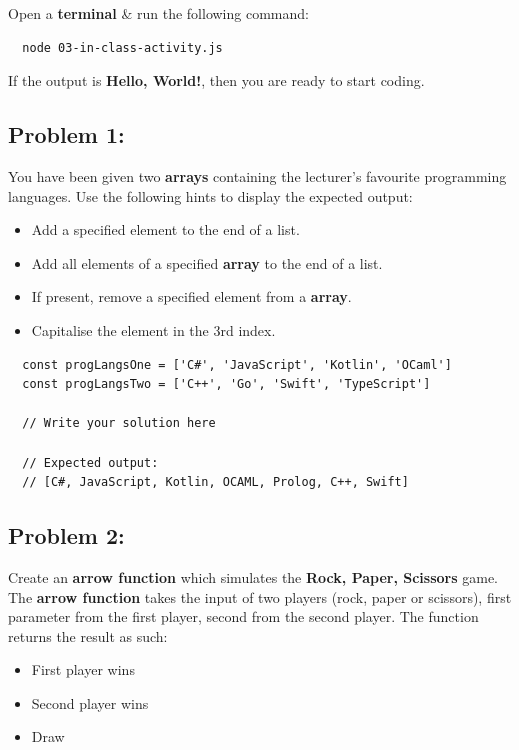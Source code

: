 \documentclass{article}
\begin{document}
Open a \textbf{terminal} \& run the following command:

\begin{verbatim}
  node 03-in-class-activity.js
\end{verbatim}

If the output is \textbf{Hello, World!}, then you are ready to start coding.

\subsection*{Problem 1:}
You have been given two \textbf{arrays} containing the lecturer's favourite programming languages. Use the following hints to display the expected output:
\begin{itemize}
  \item Add a specified element to the end of a list.
  \item Add all elements of a specified \textbf{array} to the end of a list.
  \item If present, remove a specified element from a \textbf{array}.
  \item Capitalise the element in the 3rd index.
\end{itemize}

\begin{verbatim}
  const progLangsOne = ['C#', 'JavaScript', 'Kotlin', 'OCaml']
  const progLangsTwo = ['C++', 'Go', 'Swift', 'TypeScript']

  // Write your solution here

  // Expected output:
  // [C#, JavaScript, Kotlin, OCAML, Prolog, C++, Swift]
\end{verbatim}

\subsection*{Problem 2:}
Create an \textbf{arrow function} which simulates the \textbf{Rock, Paper, Scissors} game. The \textbf{arrow function} takes the input of two players (rock, paper or scissors), first parameter from the first player, second from the second player. The function returns the result as such:

\begin{itemize}
  \item First player wins
  \item Second player wins
  \item Draw
\end{itemize}
\end{document}
